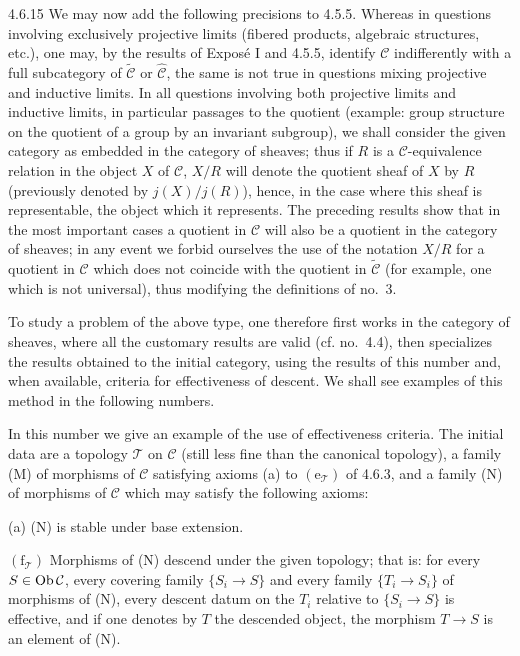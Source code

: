 \begin{scholium}{4.6.15}\label{IV.4.6.15}
We may now add the following precisions to 4.5.5.
Whereas in questions involving exclusively projective limits
(fibered products, algebraic structures, etc.), one may,
by the results of Exposé I and 4.5.5, identify \(\mathcal C\)
indifferently with a full subcategory of
\(\widetilde{\mathcal C}\) or \(\widehat{\mathcal C}\),
the same is not true in questions mixing projective and
inductive limits. In all questions involving both projective
limits and inductive limits, in particular passages to
the quotient (example: group structure on the quotient of
a group by an invariant subgroup), we shall consider the
given category as embedded in the category of sheaves;
thus if \(R\) is a \(\mathcal C\)-equivalence relation in
the object \(X\) of \(\mathcal C\), \(X/R\) will denote
the quotient sheaf of \(X\) by \(R\) (previously denoted
by \(j(X)/j(R)\)), hence, in the case where this sheaf is
representable, the object which it represents.
The preceding results show that in the most important cases
a quotient in \(\mathcal C\) will also be a quotient in the
category of sheaves; in any event we forbid ourselves the
use of the notation \(X/R\) for a quotient in \(\mathcal C\)
which does not coincide with the quotient in
\(\widetilde{\mathcal C}\) (for example, one which is not
universal), thus modifying the definitions of no.\ 3.

To study a problem of the above type, one therefore first
works in the category of sheaves, where all the customary
results are valid (cf. no.\ 4.4), then specializes the
results obtained to the initial category, using the results
of this number and, when available, criteria for effectiveness
of descent. We shall see examples of this method in the
following numbers.
\end{scholium}

In this number we give an example of the use of effectiveness
criteria. The initial data are a topology \(\mathcal T\)
on \(\mathcal C\) (still less fine than the canonical topology),
a family (M) of morphisms of \(\mathcal C\) satisfying axioms
(a) to \((\mathrm e_{\mathcal T})\) of 4.6.3, and a family
(N) of morphisms of \(\mathcal C\) which may satisfy the following axioms:

(a) (N) is stable under base extension.

\((\mathrm f_{\mathcal T})\) \og Morphisms of (N) descend
under the given topology\fg; that is: for every
\(S\in\operatorname{Ob}\mathcal C\), every covering family \(\{S_i\to S\}\)
and every family \(\{T_i\to S_i\}\) of morphisms of (N),
every descent datum on the \(T_i\) relative to \(\{S_i\to S\}\)
is effective, and if one denotes by \(T\) the descended object,
the morphism \(T\to S\) is an element of (N).

